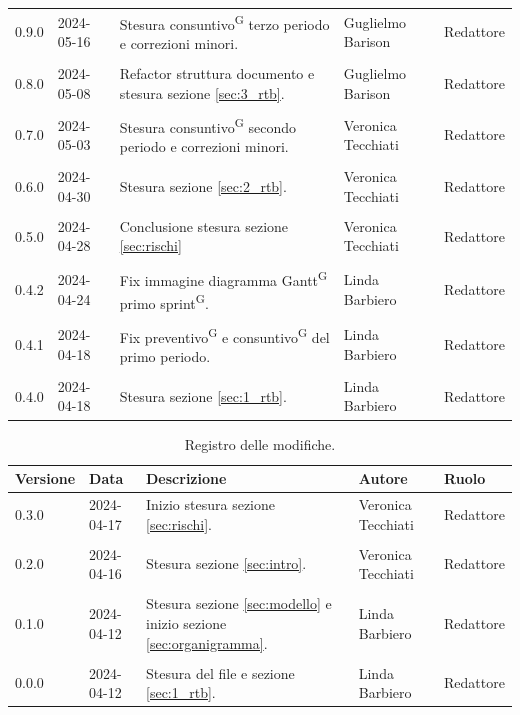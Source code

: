 \documentclass[8pt]{article}
\newcommand{\glossterm}[1]{#1\textsuperscript{G}} %
\begin{document}
\begin{table}[ht!]
\begin{tabular}{p{1.2cm} p{2cm} p{6cm} p{3cm} p{2cm}}
		0.9.0 & 2024-05-16 & Stesura \glossterm{consuntivo} terzo periodo e correzioni minori. & Guglielmo Barison & Redattore \\\\
        0.8.0 & 2024-05-08 & Refactor struttura documento e stesura sezione \ref{sec:3_rtb}. & Guglielmo Barison & Redattore \\\\
        0.7.0 & 2024-05-03 & Stesura \glossterm{consuntivo} secondo periodo e correzioni minori. & Veronica Tecchiati & Redattore \\\\
        0.6.0 & 2024-04-30 & Stesura sezione \ref{sec:2_rtb}. & Veronica Tecchiati & Redattore \\\\
        0.5.0 & 2024-04-28 & Conclusione stesura sezione \ref{sec:rischi} & Veronica Tecchiati & Redattore \\\\
		0.4.2 & 2024-04-24 & Fix immagine diagramma \glossterm{Gantt} primo \glossterm{sprint}. & Linda Barbiero & Redattore \\\\
		0.4.1 & 2024-04-18 & Fix \glossterm{preventivo} e \glossterm{consuntivo} del primo periodo. & Linda Barbiero & Redattore \\\\
		0.4.0 & 2024-04-18 & Stesura sezione \ref{sec:1_rtb}. & Linda Barbiero & Redattore \\
		\bottomrule
\end{tabular}
\newpage
\clearpage
\end{table}
\begin{table}[H]
\hypersetup{hidelinks}
	\centering
	\begin{tabular}{p{1.2cm} p{2cm} p{6cm} p{3cm} p{2cm}}
		\toprule
		\textbf{Versione}& \textbf{Data} & \textbf{Descrizione} & \textbf{Autore} & \textbf{Ruolo} \\
		\midrule 
    0.3.0 & 2024-04-17 & Inizio stesura sezione \ref{sec:rischi}. & Veronica Tecchiati & Redattore \\\\
		0.2.0 & 2024-04-16 & Stesura sezione \ref{sec:intro}. & Veronica Tecchiati & Redattore \\\\
		0.1.0 & 2024-04-12 & Stesura sezione \ref{sec:modello} e inizio sezione \ref{sec:organigramma}. & Linda Barbiero & Redattore \\\\
		0.0.0 & 2024-04-12 & Stesura del file e sezione \ref{sec:1_rtb}. & Linda Barbiero & Redattore \\
		\bottomrule
	\end{tabular}
	\caption{Registro delle modifiche.}
	\label{table:Registro delle modifiche}
\end{table}
\newpage
\clearpage
{\hypersetup{hidelinks} \tableofcontents}
\clearpage
\newpage
\newpage
{\hypersetup{hidelinks} \listoffigures}
\newpage
{\hypersetup{hidelinks} \listoftables}
\newpage
\justifying
\end{document}
